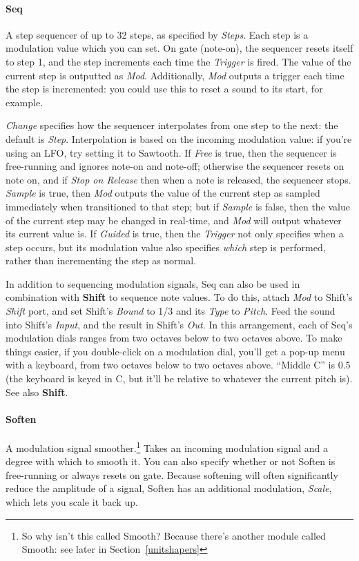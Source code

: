 \documentclass{article}
\begin{document}
\paragraph{Seq}  A step sequencer of up to 32 steps, as specified by {\it Steps}.  Each step is a modulation value which you can set.  On gate (note-on), the sequencer resets itself to step 1, and the step increments each time the {\it Trigger} is fired.  The value of the current step is outputted as {\it Mod}.  Additionally, {\it Mod} outputs a trigger each time the step is incremented: you could use this to reset a sound to its start, for example. 

{\it Change} specifies how the sequencer interpolates from one step to the next: the default is {\it Step}.  Interpolation is based on the incoming modulation value: if you're using an LFO, try setting it to Sawtooth.  If {\it Free} is true, then the sequencer is free-running and ignores note-on and note-off; otherwise the sequencer resets on note on, and if {\it Stop on Release} then when a note is released, the sequencer stops.   {\it Sample} is true, then {\it Mod} outputs the value of the current step as sampled immediately when transitioned to that step; but if {\it Sample} is false, then the value of the current step may be changed in real-time, and {\it Mod} will output whatever its current value is.  If {\it Guided} is true, then the {\it Trigger} not only specifies when a step occurs, but its modulation value also specifies {\it which} step is performed, rather than incrementing the step as normal.

In addition to sequencing modulation signals, Seq can also be used in combination with {\bf Shift} to sequence note values.  To do this, attach {\it Mod} to Shift's {\it Shift} port, and set Shift's {\it Bound} to 1/3 and its {\it Type} to {\it Pitch}.  Feed the sound into Shift's {\it Input}, and the result in Shift's {\it Out}.  In this arrangement, each of Seq's modulation dials ranges from two octaves below to two octaves above.  To make things easier, if you double-click on a modulation dial, you'll get a pop-up menu with a keyboard, from two octaves below to two octaves above.  ``Middle C'' is 0.5 (the keyboard is keyed in C, but it'll be relative to whatever the current pitch is).  See also {\bf Shift}.

\paragraph{Soften}  A modulation signal smoother.\footnote{So why isn't this called Smooth?  Because there's another module called Smooth: see later in Section~\ref{unitshapers}}  Takes an incoming modulation signal and a degree with which to smooth it.  You can also specify whether or not Soften is free-running or always resets on gate.   Because softening will often significantly reduce the amplitude of a signal, Soften has an additional modulation, {\it Scale}, which lets you scale it back up.
\end{document}
